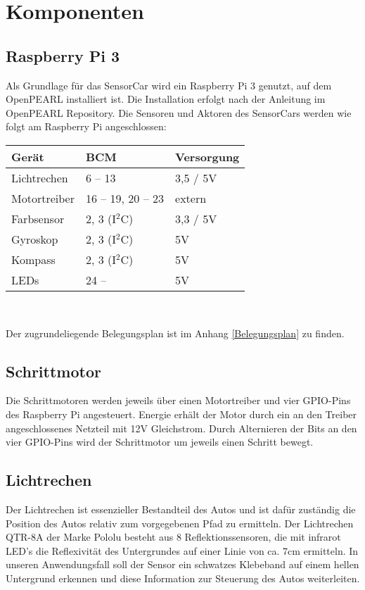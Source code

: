 \chapter{Komponenten}
\section{Raspberry Pi 3}
Als Grundlage für das SensorCar wird ein Raspberry Pi 3 genutzt, auf dem OpenPEARL installiert ist. Die Installation erfolgt nach der Anleitung im OpenPEARL Repository. Die Sensoren und Aktoren des SensorCars werden wie folgt am Raspberry Pi angeschlossen:

\begin{center}
\begin{tabular}{|l|l|l|}
	\hline
	\textbf{Gerät} & \textbf{BCM} & \textbf{Versorgung}\\
	\hline
	Lichtrechen & 6 -- 13 & 3,5 / 5V\\
	\hline
	Motortreiber& 16 -- 19, 20 -- 23 & extern\\
	\hline
	Farbsensor & 2, 3 (I$^2$C) & 3,3 / 5V\\
	\hline
	Gyroskop & 2, 3 (I$^2$C) & 5V\\
	\hline
	Kompass & 2, 3 (I$^2$C) & 5V\\
	\hline
	LEDs & 24 -- & 5V\\
	\hline
\end{tabular}\\
\end{center}
Der zugrundeliegende Belegungsplan ist im Anhang \ref{Belegungsplan} zu finden.


\section{Schrittmotor}
Die Schrittmotoren werden jeweils über einen Motortreiber und vier GPIO-Pins des Raspberry Pi angesteuert. Energie erhält der Motor durch ein an den Treiber angeschlossenes Netzteil mit 12V Gleichstrom. Durch Alternieren der Bits an den vier GPIO-Pins wird der Schrittmotor um jeweils einen Schritt bewegt. 

\section{Lichtrechen}
Der Lichtrechen ist essenzieller Bestandteil des Autos und ist dafür zuständig die Position des Autos relativ zum vorgegebenen Pfad zu ermitteln. Der Lichtrechen QTR-8A der Marke Pololu besteht aus 8 Reflektionssensoren, die mit infrarot LED’s die Reflexivität des Untergrundes auf einer Linie von ca. 7cm ermitteln. In unseren Anwendungsfall soll der Sensor ein schwatzes Klebeband auf einem hellen Untergrund erkennen und diese Information zur Steuerung des Autos weiterleiten. 

